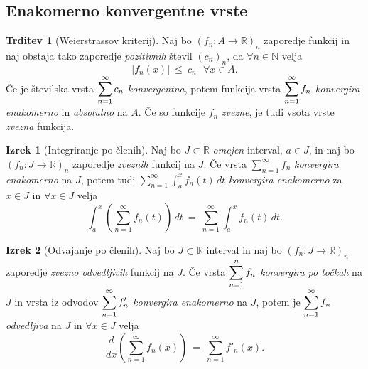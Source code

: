 \documentclass[11pt]{article}
\newcommand{\R}{\mathbb{R}}
\newcommand{\N}{\mathbb{N}}
\theoremstyle{definition}
\theoremstyle{definition}
\newtheorem{trditev}{Trditev}[section]
\theoremstyle{definition}
\newtheorem{izrek}{Izrek}[section]
\theoremstyle{theorem}
\begin{document}

\subsection{Enakomerno konvergentne vrste}
\vspace{0.5cm}

\begin{trditev}[Weierstrassov kriterij]

Naj bo $(f_n: A \rightarrow \R)_n$ zaporedje funkcij in naj obstaja tako zaporedje \textit{pozitivnih} števil $(c_n)_n$, da $\forall n \in \N$ velja
$$|f_n(x)| ~\leq~ c_n ~~~\forall x \in A.$$
Če je številska vrsta $\mathlarger{\sum_{n=1}^\infty c_n}$ \textit{konvergentna}, potem funkcija vrsta $\mathlarger{\sum_{n=1}^\infty f_n}$ \textit{konvergira enakomerno} in \textit{absolutno} na $A$. Če so funkcije $f_n$ \textit{zvezne}, je tudi vsota vrste \textit{zvezna} funkcija.

\end{trditev}
\vspace{0.5cm}

\begin{izrek}[Integriranje po členih]

Naj bo $J \subset \R$ \textit{omejen} interval, $a \in J$, in naj bo $(f_n: J \rightarrow \R)_n$ zaporedje \textit{zveznih} funkcij na $J$. Če vrsta $\sum_{n=1}^\infty f_n$ \textit{konvergira enakomerno} na $J$, potem tudi $\sum_{n=1}^\infty \int_a^x f_n(t)\,dt$ \textit{konvergira enakomerno} za $x \in J$ in $\forall x \in J$ velja
$$\int_a^x \left( \sum_{n=1}^\infty f_n(t) \right)\,dt ~=~ \sum_{n=1}^\infty \int_a^x f_n(t)\,dt.$$

\end{izrek}
\vspace{0.5cm}

\begin{izrek}[Odvajanje po členih]

Naj bo $J \subset \R$ interval in naj bo $(f_n: J \rightarrow \R)_n$ zaporedje \textit{zvezno odvedljivih} funkcij na $J$. Če vrsta $\mathlarger{\sum_{n=1}^n f_n}$ \textit{konvergira po točkah} na $J$ in vrsta iz odvodov $\mathlarger{\sum_{n=1}^\infty f'_n}$ \textit{konvergira enakomerno} na $J$, potem je $\mathlarger{\sum_{n=1}^\infty f_n}$ \textit{odvedljiva} na $J$ in $\forall x \in J$ velja
$$\frac{d}{dx} \left( \sum_{n=1}^\infty f_n(x) \right) ~=~ \sum_{n=1}^\infty f'_n(x).$$

\end{izrek}
\vspace{0.5cm}
\end{document}
